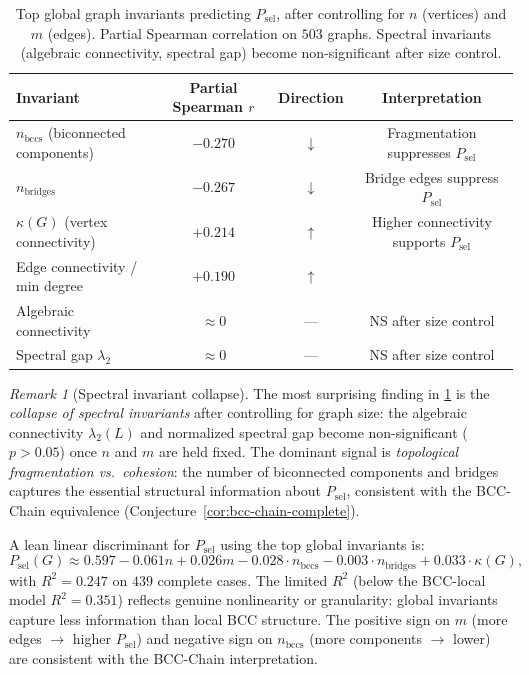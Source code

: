 \documentclass[11pt]{article}
\theoremstyle{definition}
\theoremstyle{remark}
\newtheorem{remark}[theorem]{Remark}
\begin{document}
\begin{table}[ht]
\centering
\caption{Top global graph invariants predicting $P_{\mathrm{sel}}$, after
controlling for $n$ (vertices) and $m$ (edges). Partial Spearman correlation
on $503$ graphs. Spectral invariants (algebraic connectivity, spectral gap)
become non-significant after size control.}
\label{tab:global-discriminant}
\renewcommand{\arraystretch}{1.3}
\begin{tabular}{lccc}
\toprule
Invariant & Partial Spearman $r$ & Direction & Interpretation \\
\midrule
$n_{\mathrm{bccs}}$ (biconnected components) & $-0.270$ & $\downarrow$ & Fragmentation suppresses $P_{\mathrm{sel}}$ \\
$n_{\mathrm{bridges}}$ & $-0.267$ & $\downarrow$ & Bridge edges suppress $P_{\mathrm{sel}}$ \\
$\kappa(G)$ (vertex connectivity) & $+0.214$ & $\uparrow$ & Higher connectivity supports $P_{\mathrm{sel}}$ \\
Edge connectivity / min degree & $+0.190$ & $\uparrow$ & \\
Algebraic connectivity & $\approx 0$ & --- & NS after size control \\
Spectral gap $\lambda_2$ & $\approx 0$ & --- & NS after size control \\
\bottomrule
\end{tabular}
\end{table}

\begin{remark}[Spectral invariant collapse]
The most surprising finding in \cref{tab:global-discriminant} is the
\emph{collapse of spectral invariants} after controlling for graph size:
the algebraic connectivity $\lambda_2(L)$ and normalized spectral gap
become non-significant ($p > 0.05$) once $n$ and $m$ are held fixed.
The dominant signal is \emph{topological fragmentation vs.\ cohesion}:
the number of biconnected components and bridges captures the essential
structural information about $P_{\mathrm{sel}}$, consistent with the
BCC-Chain equivalence (Conjecture~\ref{cor:bcc-chain-complete}).
\end{remark}

A lean linear discriminant for $P_{\mathrm{sel}}$ using the top global
invariants is:
\begin{equation}
  P_{\mathrm{sel}}(G) \approx 0.597 - 0.061n + 0.026m
    - 0.028 \cdot n_{\mathrm{bccs}} - 0.003 \cdot n_{\mathrm{bridges}}
    + 0.033 \cdot \kappa(G),
  \label{eq:psel-discriminant}
\end{equation}
with $R^2 = 0.247$ on $439$ complete cases. The limited $R^2$ (below the
BCC-local model $R^2 = 0.351$) reflects genuine nonlinearity or granularity:
global invariants capture less information than local BCC structure. The
positive sign on $m$ (more edges $\to$ higher $P_{\mathrm{sel}}$) and
negative sign on $n_{\mathrm{bccs}}$ (more components $\to$ lower) are
consistent with the BCC-Chain interpretation.
\end{document}
